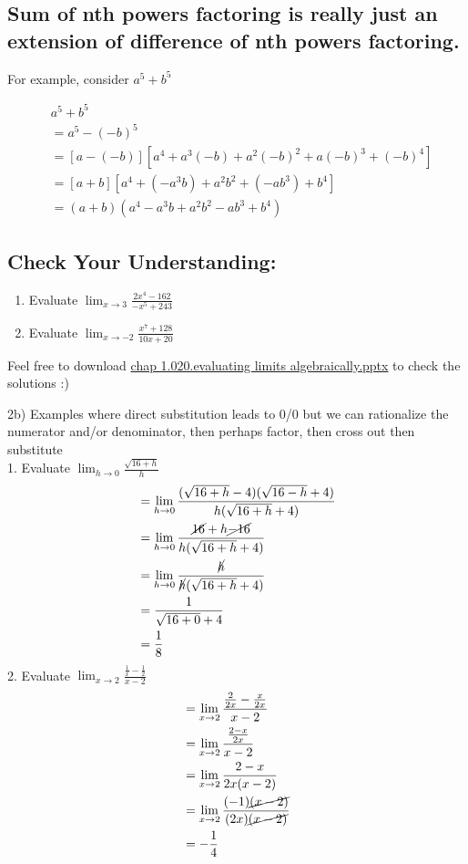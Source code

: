\documentclass{article}
\begin{document}
\subsection*{Sum of nth powers factoring is really just an extension of difference of nth powers factoring.}
For example, consider $a^5+b^5$

$$
\begin{aligned}
& a^5+b^5 \\
& =a^5-(-b)^5 \\
& =[a-(-b)]\left[a^4+a^3(-b)+a^2(-b)^2+a(-b)^3+(-b)^4\right] \\
& =[a+b]\left[a^4+\left(-a^3 b\right)+a^2 b^2+\left(-a b^3\right)+b^4\right] \\
& =(a+b)\left(a^4-a^3 b+a^2 b^2-a b^3+b^4\right)
\end{aligned}
$$ 
\subsection*{Check Your Understanding:}
\begin{enumerate}
    \item Evaluate $\lim_{x \to 3}\frac{2x^4-162}{-x^5+243}$
    \item Evaluate $\lim_{x \to -2}\frac{x^7+128}{10x+20}$ 
\end{enumerate}
Feel free to download \href{https://github.com/Kensukeken/MCV4U-Calculus-and-Vectors-Notes/blob/main/Lessons%20in%20Power%20Point%20Form/Unit%201/chap%201.010.evaluating%20limits%20graphically.pptx}{chap 1.020.evaluating limits algebraically.pptx} to check the solutions :) 

 2b)  Examples where direct substitution leads to 0/0 but we can rationalize the numerator and/or denominator, then perhaps factor, then cross out then substitute\\

 1. Evaluate $\lim_{h\to 0}\frac{\sqrt{16+h}}{h}$
 \begin{align*}
     &=\lim_{h\to 0}\frac{(\sqrt{16+h}-4)(\sqrt{16-h}+4)}{h(\sqrt{16+h}+4)}\\
     &=\lim_{h\to 0}\frac{\cancel{16}+h\cancel{-16}}{h(\sqrt{16+h}+4)}\\
     &=\lim_{h\to 0}\frac{\cancel{h}}{\cancel{h}(\sqrt{16+h}+4)}\\
     &=\frac{1}{\sqrt{16+0}+4}\\
     &=\frac{1}{8}
 \end{align*}
2. Evaluate $\lim_{x \to 2}\frac{\frac{1}{x}-\frac{1}{2}}{x-2}$
\begin{align*}
    &=\lim_{x \to 2}\frac{\frac{2}{2x}-\frac{x}{2x}}{x-2}\\
    &=\lim_{x \to 2}\frac{\frac{2-x}{2x}}{x-2}\\
    &=\lim_{x \to 2}\frac{2-x}{2x(x-2)}\\
    &=\lim_{x \to 2}\frac{(-1)\cancel{(x-2)}}{(2x)\cancel{(x-2)}}\\
    &=-\frac{1}{4}
\end{align*}
\end{document}
